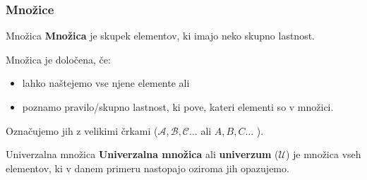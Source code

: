         \begin{frame}
            \frametitle{Množice}
            \begin{alertblock}{Množica}
                \textbf{Množica} je skupek elementov, ki imajo neko skupno lastnost.

            \end{alertblock}
            \begin{block}{}
                Množica je določena, če:
                \begin{itemize}
                    \item lahko naštejemo vse njene elemente ali
                    \item poznamo pravilo/skupno lastnost, ki pove, kateri elementi so v množici.
                \end{itemize}
            \end{block}
            \begin{block}{}
                Označujemo jih z velikimi črkami ($\mathcal{A}, \mathcal{B}, \mathcal{C} \dots$ ali  
                $A, B, C \dots$ ). 
            \end{block}

            \begin{alertblock}{Univerzalna množica}
                \textbf{Univerzalna množica} ali \textbf{univerzum} ($\mathcal{U}$) je množica 
                vseh elementov, ki v danem primeru nastopajo oziroma jih opazujemo.

            \end{alertblock}

        \end{frame}      

